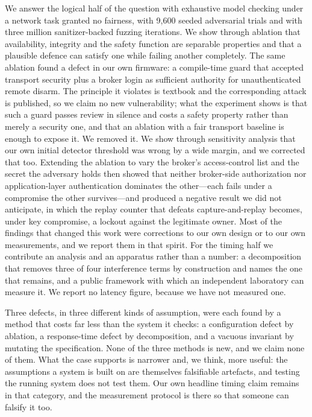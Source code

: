 We answer the logical half of the question with exhaustive model checking under a network task
granted no fairness, with 9{,}600 seeded adversarial trials and with three million
sanitizer-backed fuzzing iterations. We show through ablation that availability, integrity and
the safety function are separable properties and that a plausible defence can satisfy one while
failing another completely. The same ablation found a defect in our own firmware: a compile-time
guard that accepted transport security plus a broker login as sufficient authority for
unauthenticated remote disarm. The principle it violates is textbook and the corresponding
attack is published, so we claim no new vulnerability; what the experiment shows is that such a
guard passes review in silence and costs a safety property rather than merely a security one,
and that an ablation with a fair transport baseline is enough to expose it. We removed it. We
show through sensitivity analysis that our own initial detector threshold was wrong by a wide
margin, and we corrected that too. Extending the ablation to vary the broker's access-control
list and the secret the adversary holds then showed that neither broker-side authorization nor
application-layer authentication dominates the other---each fails under a compromise the other
survives---and produced a negative result we did not anticipate, in which the replay counter
that defeats capture-and-replay becomes, under key compromise, a lockout against the
legitimate owner. Most of the findings that changed this work were corrections to our own
design or to our own measurements, and we report them in that spirit. For the timing half we contribute an analysis
and an apparatus rather than a number: a decomposition that removes three of four interference
terms by construction and names the one that remains, and a public framework with which an
independent laboratory can measure it. We report no latency figure, because we have not
measured one.

Three defects, in three different kinds of assumption, were each found by a method that costs
far less than the system it checks: a configuration defect by ablation, a response-time defect
by decomposition, and a vacuous invariant by mutating the specification. None of the three
methods is new, and we claim none of them. What the case supports is narrower and, we think,
more useful: the assumptions a system is built on are themselves falsifiable artefacts, and
testing the running system does not test them. Our own headline timing claim remains in that
category, and the measurement protocol is there so that someone can falsify it too.

